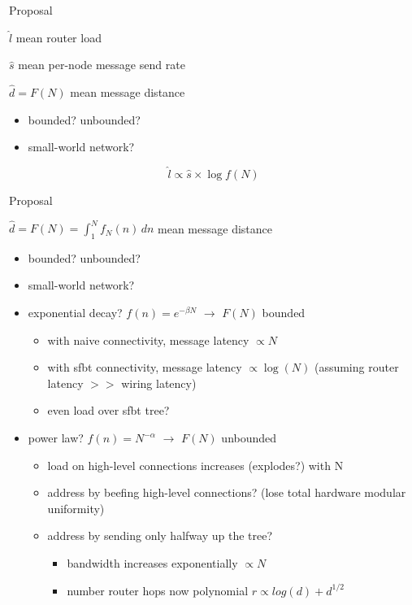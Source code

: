 \begin{frame}{Proposal}

$\hat{l}$ mean router load

$\hat{s}$ mean per-node message send rate

$\hat{d} = F(N)$ mean message distance
\begin{itemize}
\item bounded? unbounded?
\item small-world network?
\end{itemize}

{\Huge
\[
\hat{l} \propto \hat{s} \times \log{f(N)}
\]}

\end{frame}

\begin{frame}{Proposal}

$\hat{d} = F(N) = \int_1^N f_N(n) \, dn$ mean message distance

\begin{itemize}
\item bounded? unbounded?
\item small-world network?
\item exponential decay? $f(n) = e^{-\beta N}$ $\rightarrow$ $F(N)$ bounded
  \begin{itemize}
    \item with naive connectivity, message latency $\propto N$
    \item with sfbt connectivity, message latency $\propto \log(N)$ (assuming router latency $>>$ wiring latency)
    \item even load over sfbt tree?
  \end{itemize}
\item power law? $f(n) = N^{-\alpha}$ $\rightarrow$ $F(N)$ unbounded
  \begin{itemize}
    \item load on high-level connections increases (explodes?) with N
    \item address by beefing high-level connections? (lose total hardware modular uniformity)
    \item address by sending only halfway up the tree?
    \begin{itemize}
      \item bandwidth increases exponentially $\propto N$
      \item number router hops now polynomial $r \propto log(d) + d^{1/2}$
    \end{itemize}
  \end{itemize}
\end{itemize}

\end{frame}

